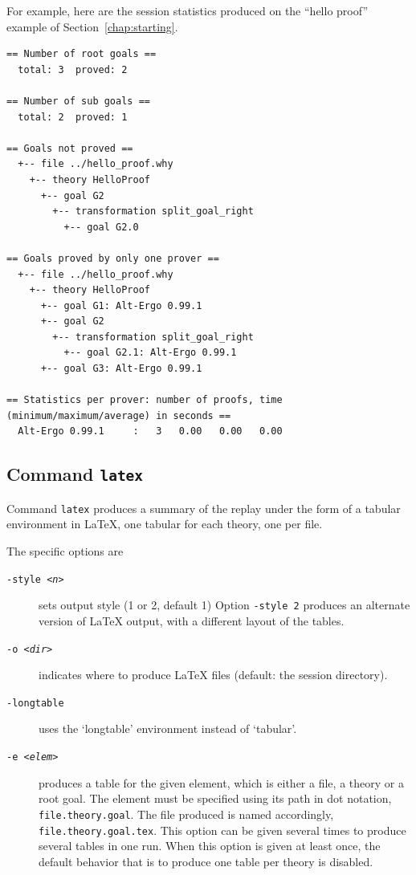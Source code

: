 For example, here are the session statistics produced on the ``hello
proof'' example of Section~\ref{chap:starting}.
{\footnotesize
\begin{verbatim}
== Number of root goals ==
  total: 3  proved: 2

== Number of sub goals ==
  total: 2  proved: 1

== Goals not proved ==
  +-- file ../hello_proof.why
    +-- theory HelloProof
      +-- goal G2
        +-- transformation split_goal_right
          +-- goal G2.0

== Goals proved by only one prover ==
  +-- file ../hello_proof.why
    +-- theory HelloProof
      +-- goal G1: Alt-Ergo 0.99.1
      +-- goal G2
        +-- transformation split_goal_right
          +-- goal G2.1: Alt-Ergo 0.99.1
      +-- goal G3: Alt-Ergo 0.99.1

== Statistics per prover: number of proofs, time (minimum/maximum/average) in seconds ==
  Alt-Ergo 0.99.1     :   3   0.00   0.00   0.00
\end{verbatim}
}

\subsection{Command \texttt{latex}}

Command \texttt{latex} produces a summary of the replay under the form
of a tabular environment in LaTeX, one tabular for each theory, one
per file.

The specific options are
\begin{description}
\item[\texttt{-style \textsl{<n>}}] sets output style (1 or 2, default 1)
  Option \texttt{-style 2} produces an alternate version of LaTeX
  output, with a different layout of the tables.
\item[\texttt{-o \textsl{<dir>}}] indicates where
  to produce LaTeX files (default: the session directory).
\item[\texttt{-longtable}] uses the `longtable' environment instead of
  `tabular'.
\item[\texttt{-e \textsl{<elem>}}] produces a table for the given element, which is
  either a file, a theory or a root goal. The element must be specified
  using its path in dot notation, \eg \verb|file.theory.goal|. The
  file produced is named accordingly,
  \eg \verb|file.theory.goal.tex|.  This option can be given several
  times to produce several tables in one run. When this option is
  given at least once, the default behavior that is to produce one
  table per theory is disabled.
\end{description}

